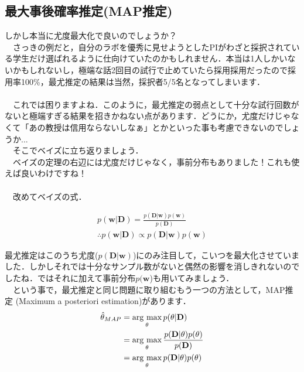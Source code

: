 \documentclass[11pt,a4paper]{jsarticle}                    %
\newcommand{\argmax}{\mathop{\rm arg~max}\limits}
\begin{document}
\subsection{最大事後確率推定(MAP推定)}
しかし本当に尤度最大化で良いのでしょうか？\\
　さっきの例だと，自分のラボを優秀に見せようとしたPIがわざと採択されている学生だけ選ばれるように仕向けていたのかもしれません．本当は1人しかいないかもしれないし，極端な話2回目の試行で止めていたら採用採用だったので採用率100\%，最尤推定の結果は当然，採択者5/5名となってしまいます．\\
\\
　これでは困りますよね．このように，最尤推定の弱点として十分な試行回数がないと極端すぎる結果を招きかねない点があります．どうにか，尤度だけじゃなくて「あの教授は信用ならないしなぁ」とかといった事も考慮できないのでしょうか...\\
　そこでベイズに立ち返りましょう．\\
　ベイズの定理の右辺には尤度だけじゃなく，事前分布もありました！これも使えば良いわけですね！\\
\\
　改めてベイズの式．

\begin{eqnarray}
p(\mathbf{w}|\mathbf{D}) = \frac{p(\mathbf{D}|\mathbf{w})p(\mathbf{w})}{p(\mathbf{D})} \\
\therefore p(\mathbf{w}|\mathbf{D}) \propto p(\mathbf{D}|\mathbf{w})p(\mathbf{w})
\end{eqnarray}


最尤推定はこのうち尤度($p(\mathbf{D}|\mathbf{w})$)にのみ注目して，こいつを最大化させていました．しかしそれでは十分なサンプル数がないと偶然の影響を消しきれないのでしたね．ではそれに加えて事前分布$p(\mathbf{w}$)も用いてみましょう．\\
　という事で，最尤推定と同じ問題に取り組むもう一つの方法として，MAP推定 (Maximum a posteriori estimation)があります．\\

\begin{eqnarray}
\begin{split}
\hat \theta_{MAP} &=\argmax_\theta p(\theta|\mathbf{D})\\
& = \argmax_\theta \frac{p(\mathbf{D}|\theta)p(\theta)}{p(\mathbf{D})}\\
&= \argmax_\theta p(\mathbf{D}|\theta)p(\theta)
\end{split}
\end{eqnarray}
\end{document}
